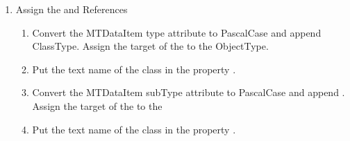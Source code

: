 \begin{enumerate}
\begin{itemize}
\begin{enumerate}
\begin{enumerate}
        \item If the  matches one of the  , the MTConnect UA \gls{TypeDefinition} is . The  will be assigned as follows:
        \newline
        
        Each of the \glspl{ObjectType} matching the  for  will have a \gls{Property} . The  will reference the  with the values of the \gls{ControlledVocab}.
        
        \item Otherwise, the UA \gls{TypeDefinition} is . This will apply to all extended types.
      \end{enumerate}
    \end{enumerate}
  \end{itemize}
  
  \item Assign the  and  \glspl{Reference}
  \begin{enumerate}
    \item Convert the \gls{MTDataItem} \gls{type} attribute to \gls{PascalCase} and append \gls{ClassType}. Assign the target of the  to the \gls{ObjectType}.
    \item Put the text name of the class in the property .
    \item Convert the \gls{MTDataItem} \gls{subType} attribute to \gls{PascalCase} and append . Assign the target of the  to the 
    \item Put the text name of the class in the property .
  \end{enumerate}
  

\end{enumerate}
